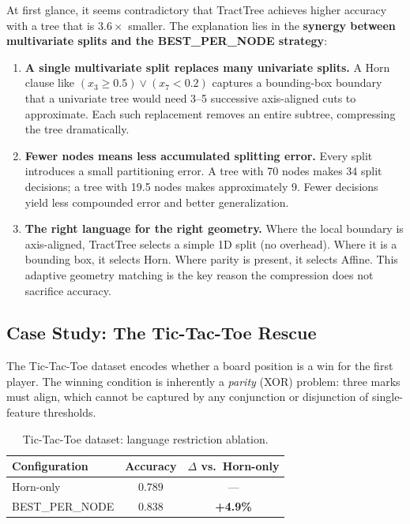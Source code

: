 \documentclass[11pt,a4paper]{article}
\begin{document}
At first glance, it seems contradictory that TractTree achieves higher accuracy with a tree that is $3.6\times$ smaller. The explanation lies in the \textbf{synergy between multivariate splits and the BEST\_PER\_NODE strategy}:

\begin{enumerate}[leftmargin=2em]
    \item \textbf{A single multivariate split replaces many univariate splits.} A Horn clause like $(x_3 \geq 0.5) \vee (x_7 < 0.2)$ captures a bounding-box boundary that a univariate tree would need 3--5 successive axis-aligned cuts to approximate. Each such replacement removes an entire subtree, compressing the tree dramatically.

    \item \textbf{Fewer nodes means less accumulated splitting error.} Every split introduces a small partitioning error. A tree with 70 nodes makes 34 split decisions; a tree with 19.5 nodes makes approximately 9. Fewer decisions yield less compounded error and better generalization.

    \item \textbf{The right language for the right geometry.} Where the local boundary is axis-aligned, TractTree selects a simple 1D split (no overhead). Where it is a bounding box, it selects Horn. Where parity is present, it selects Affine. This adaptive geometry matching is the key reason the compression does not sacrifice accuracy.
\end{enumerate}

\subsection{Case Study: The Tic-Tac-Toe Rescue}

The Tic-Tac-Toe dataset encodes whether a board position is a win for the first player. The winning condition is inherently a \emph{parity} (XOR) problem: three marks must align, which cannot be captured by any conjunction or disjunction of single-feature thresholds.

\begin{table}[H]
\centering
\caption{Tic-Tac-Toe dataset: language restriction ablation.}
\label{tab:tictactoe}
\begin{tabular}{@{}lcc@{}}
\toprule
\textbf{Configuration} & \textbf{Accuracy} & \textbf{$\Delta$ vs.\ Horn-only} \\
\midrule
Horn-only             & $0.789$ & ---           \\
BEST\_PER\_NODE       & $\mathbf{0.838}$ & \textcolor{wingreen}{\textbf{+4.9\%}} \\
\bottomrule
\end{tabular}
\end{table}
\end{document}
